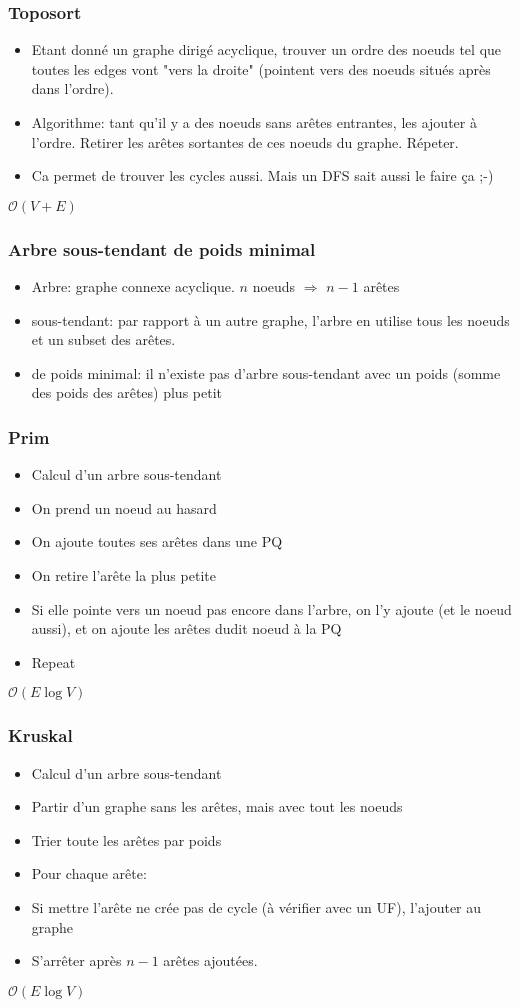 \documentclass[8pt,aspectratio=169]{beamer}
\begin{document}
\begin{frame}
\frametitle{Toposort}
\begin{itemize}
	\item Etant donné un graphe dirigé acyclique, trouver un ordre des noeuds tel que toutes les edges vont "vers la droite" (pointent vers des noeuds situés après dans l'ordre).
	\item Algorithme: tant qu'il y a des noeuds sans arêtes entrantes, les ajouter à l'ordre. Retirer les arêtes sortantes de ces noeuds du graphe. Répeter.
	\item Ca permet de trouver les cycles aussi. Mais un DFS sait aussi le faire ça ;-)
\end{itemize}
$\mathcal{O}(V+E)$
\end{frame}

\begin{frame}
\frametitle{Arbre sous-tendant de poids minimal}
\begin{itemize}
	\item Arbre: graphe connexe acyclique. $n$ noeuds $\Rightarrow$ $n-1$ arêtes
	\item sous-tendant: par rapport à un autre graphe, l'arbre en utilise tous les noeuds et un subset des arêtes.
	\item de poids minimal: il n'existe pas d'arbre sous-tendant avec un poids (somme des poids des arêtes) plus petit
\end{itemize}
\end{frame}

\begin{frame}
\frametitle{Prim}
\begin{itemize}
	\item Calcul d'un arbre sous-tendant
	\item On prend un noeud au hasard
	\item On ajoute toutes ses arêtes dans une PQ
	\item On retire l'arête la plus petite
	\item Si elle pointe vers un noeud pas encore dans l'arbre, on l'y ajoute (et le noeud aussi), et on ajoute les arêtes dudit noeud à la PQ
	\item Repeat
\end{itemize}
$\mathcal{O}(E \log V)$
\end{frame}

\begin{frame}
\frametitle{Kruskal}
\begin{itemize}
	\item Calcul d'un arbre sous-tendant
	\item Partir d'un graphe sans les arêtes, mais avec tout les noeuds
	\item Trier toute les arêtes par poids
	\item Pour chaque arête:
	\item Si mettre l'arête ne crée pas de cycle (à vérifier avec un UF), l'ajouter au graphe
	\item S'arrêter après $n-1$ arêtes ajoutées.
\end{itemize}
$\mathcal{O}(E \log V)$
\end{frame}
\end{document}
